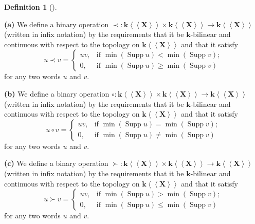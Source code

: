 \documentclass
[numbers=enddot,12pt,final,onecolumn,notitlepage,abstracton]{scrartcl}%
\theoremstyle{definition}
\newtheorem{defi}[theo]{Definition}
\newenvironment{definition}[1][]
{\begin{defi}[#1]\begin{leftbar}}
{\end{leftbar}\end{defi}}
\begin{document}
\begin{definition}
\label{def.five-ops}\textbf{(a)} We define a binary operation $\left.
\prec\right.  :\mathbf{k}\left\langle \left\langle \mathbf{X}\right\rangle
\right\rangle \times\mathbf{k}\left\langle \left\langle \mathbf{X}%
\right\rangle \right\rangle \rightarrow\mathbf{k}\left\langle \left\langle
\mathbf{X}\right\rangle \right\rangle $ (written in infix notation) by the
requirements that it be $\mathbf{k}$-bilinear and continuous with respect to
the topology on $\mathbf{k}\left\langle \left\langle \mathbf{X}\right\rangle
\right\rangle $ and that it satisfy%
\[
u\left.  \prec\right.  v=
\begin{cases}
uv, & \text{if }\min\left(  \operatorname*{Supp}u\right)  <\min\left(
\operatorname*{Supp}v\right)  ;\\
0, & \text{if }\min\left(  \operatorname*{Supp}u\right)  \geq\min\left(
\operatorname*{Supp}v\right)
\end{cases}
\]
for any two words $u$ and $v$.

\textbf{(b)} We define a binary operation $\circ:\mathbf{k}\left\langle
\left\langle \mathbf{X}\right\rangle \right\rangle \times\mathbf{k}%
\left\langle \left\langle \mathbf{X}\right\rangle \right\rangle \rightarrow
\mathbf{k}\left\langle \left\langle \mathbf{X}\right\rangle \right\rangle $
(written in infix notation) by the requirements that it be $\mathbf{k}%
$-bilinear and continuous with respect to the topology on $\mathbf{k}%
\left\langle \left\langle \mathbf{X}\right\rangle \right\rangle $ and that it
satisfy%
\[
u\circ v=
\begin{cases}
uv, & \text{if }\min\left(  \operatorname*{Supp}u\right)  =\min\left(
\operatorname*{Supp}v\right)  ;\\
0, & \text{if }\min\left(  \operatorname*{Supp}u\right)  \neq\min\left(
\operatorname*{Supp}v\right)
\end{cases}
\]
for any two words $u$ and $v$.

\textbf{(c)} We define a binary operation $\left.  \succ\right.
:\mathbf{k}\left\langle \left\langle \mathbf{X}\right\rangle \right\rangle
\times\mathbf{k}\left\langle \left\langle \mathbf{X}\right\rangle
\right\rangle \rightarrow\mathbf{k}\left\langle \left\langle \mathbf{X}%
\right\rangle \right\rangle $ (written in infix notation) by the requirements
that it be $\mathbf{k}$-bilinear and continuous with respect to the topology
on $\mathbf{k}\left\langle \left\langle \mathbf{X}\right\rangle \right\rangle
$ and that it satisfy%
\[
u\left.  \succ\right.  v=
\begin{cases}
uv, & \text{if }\min\left(  \operatorname*{Supp}u\right)  >\min\left(
\operatorname*{Supp}v\right)  ;\\
0, & \text{if }\min\left(  \operatorname*{Supp}u\right)  \leq\min\left(
\operatorname*{Supp}v\right)
\end{cases}
\]
for any two words $u$ and $v$.


\end{definition}
\end{document}
